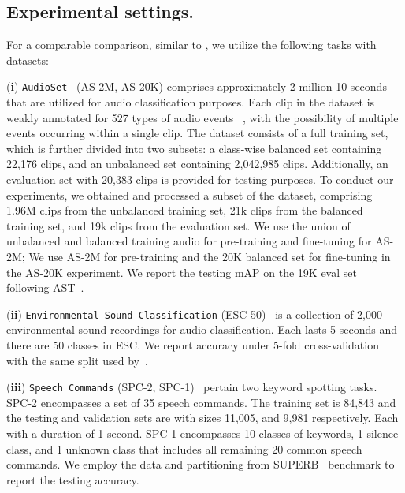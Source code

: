 \documentclass{article}
\begin{document}
\subsection{Experimental settings.}


For a comparable comparison, similar to \cite{huang2022masked}, we utilize the following tasks with datasets: 

\noindent
(\textbf{i}) \texttt{AudioSet}~\cite{gemmeke2017audio} (AS-2M, AS-20K)
comprises approximately 2 million 10 seconds that are utilized for audio classification purposes. Each clip in the dataset is weakly annotated for 527 types of audio events ~\cite{tagging_right,vggish,hershey2021benefit}, with the possibility of multiple events occurring within a single clip. The dataset consists of a full training set, which is further divided into two subsets: a class-wise balanced set containing 22,176 clips, and an unbalanced set containing 2,042,985 clips. Additionally, an evaluation set with 20,383 clips is provided for testing purposes. To conduct our experiments, we obtained and processed a subset of the dataset, comprising 1.96M clips from the unbalanced training set, 21k clips from the balanced training set, and 19k clips from the evaluation set. 
We use the union of unbalanced and balanced training audio for pre-training and fine-tuning for AS-2M; We use AS-2M for pre-training and the 20K balanced set for fine-tuning in the AS-20K experiment.
We report the testing mAP on the 19K eval set following AST~\cite{gong2021ast}. 

\noindent
(\textbf{ii}) \texttt{Environmental Sound Classification} 
(ESC-50)~\cite{piczak2015dataset} is a collection of 2,000 environmental sound recordings for audio classification. Each lasts 5 seconds and there are 50 classes in ESC. We report accuracy under 5-fold cross-validation with the same split used by~\cite{gong2021ast}. 

\noindent
(\textbf{iii}) \texttt{Speech Commands} (SPC-2, SPC-1)~\cite{speechcommandsv2} pertain two keyword spotting tasks.
SPC-2 encompasses a set of 35 speech commands. 
The training set is 84,843 and the testing and validation sets are with sizes 11,005, and 9,981 respectively. Each with a duration of 1 second. 
SPC-1 encompasses 10 classes of keywords, 1 silence class, and 1 unknown class that includes all remaining 20 common speech commands. We employ the data and partitioning from SUPERB~\cite{yang21c_interspeech} benchmark to report the testing accuracy.
\end{document}
